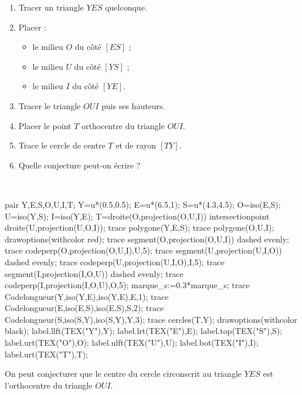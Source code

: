 \begin{exercice*}
   \begin{enumerate}
   \item Tracer un triangle $YES$ quelconque.
      \item Placer :
      \begin{itemize}
         \item le milieu $O$ du côté $[ES]$ ;
         \item le milieu $U$ du côté $[YS]$ ;
         \item le milieu $I$ du côté $[YE]$.
      \end{itemize}
      \item Tracer le triangle $OUI$ puis ses hauteurs.
      \item Placer le point $T$ orthocentre du triangle $OUI$.
      \item Trace le cercle de centre $T$ et de rayon
$[TY]$.
      \item Quelle conjecture peut-on écrire ?
   \end{enumerate}
\end{exercice*}

\begin{corrige}
   \ \\ [-5mm]
   \begin{Geometrie}[CoinBG={(0,-2u)}]
      pair Y,E,S,O,U,I,T;
      Y=u*(0.5,0.5);
      E=u*(6.5,1);
      S=u*(4.3,4.5);
      O=iso(E,S);
      U=iso(Y,S);
      I=iso(Y,E);
      T=droite(O,projection(O,U,I)) intersectionpoint droite(U,projection(U,O,I));
      trace polygone(Y,E,S);
      trace polygone(O,U,I);
      drawoptions(withcolor red);
      trace segment(O,projection(O,U,I)) dashed evenly;
      trace codeperp(O,projection(O,U,I),U,5); 
      trace segment(U,projection(U,I,O)) dashed evenly;
      trace codeperp(U,projection(U,I,O),I,5); 
      trace segment(I,projection(I,O,U)) dashed evenly;
      trace codeperp(I,projection(I,O,U),O,5);
      marque_s:=0.3*marque_s;
      trace Codelongueur(Y,iso(Y,E),iso(Y,E),E,1); 
      trace Codelongueur(E,iso(E,S),iso(E,S),S,2); 
      trace Codelongueur(S,iso(S,Y),iso(S,Y),Y,3);
      trace cercles(T,Y);
      drawoptions(withcolor black);
      label.llft(TEX("Y"),Y);
      label.lrt(TEX("E"),E);
      label.top(TEX("S"),S);
      label.urt(TEX("O"),O);
      label.ulft(TEX("U"),U);
      label.bot(TEX("I"),I);
      label.urt(TEX("T"),T);
   \end{Geometrie}

   On peut conjecturer que {\red le centre du cercle circonscrit au triangle $YES$ est l'orthocentre du triangle $OUI$}.
\end{corrige}
